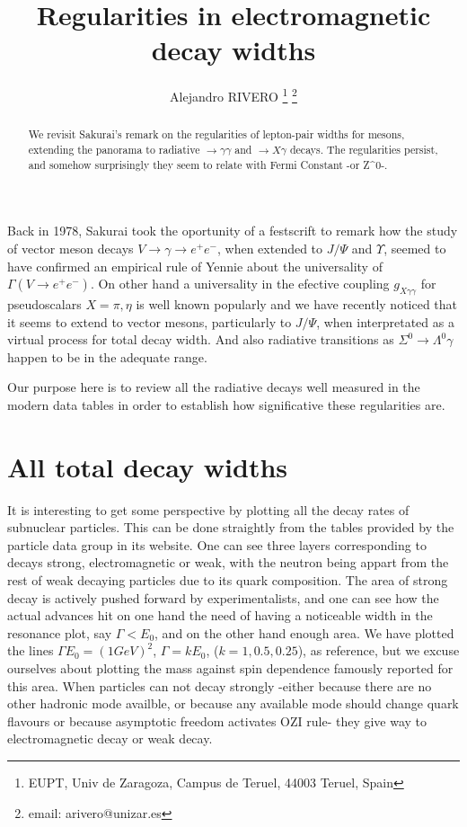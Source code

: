 \documentclass{article}
\begin{document}
\title{Regularities in electromagnetic decay widths}
\author{Alejandro RIVERO \thanks{EUPT, 
Univ de Zaragoza, Campus de Teruel, 
 44003 Teruel, Spain} \thanks{email: arivero@unizar.es}}

\maketitle

\begin{abstract}
We revisit Sakurai's remark on the regularities of lepton-pair widths for
mesons, extending the panorama to radiative $\to \gamma \gamma$ and 
$\to X \gamma$ decays. The regularities persist, and somehow surprisingly
they seem to relate with Fermi Constant -or Z^0-.
\end{abstract}

Back in 1978, Sakurai took the oportunity of a festscrift  \cite{Sakurai:1978xb} to 
remark how the study of 
vector meson decays $V \to \gamma \to e^+ e^-$, when extended to $J/\Psi$ and $\Upsilon$,
seemed to have confirmed an empirical rule of Yennie about the universality of  $\Gamma (V \to e^+ e^-)$. On other hand a universality in the efective coupling 
$g_{X\gamma\gamma}$ for pseudoscalars $X=\pi,\eta$ is well known popularly and we have recently
noticed that it seems to extend to vector mesons, particularly to $J/\Psi$, when interpretated
as a virtual process for total decay width. And also radiative transitions as $\Sigma^0 \to
\Lambda^0 \gamma$ happen to be in the adequate range. 

Our purpose here is to review all the radiative decays well measured in the modern data tables
in order to establish how significative these regularities are.

\section{All total decay widths}
It is interesting to get some perspective by plotting all the decay rates of subnuclear 
particles. This can be done straightly from the tables provided by the particle data group \cite{}
in its website. One can see three layers corresponding to decays strong, 
electromagnetic or weak, with the neutron being appart
from the rest of weak
decaying particles due to its quark composition.
The area of strong decay is actively pushed forward by experimentalists, 
and one can see how the actual advances hit on one hand the need of 
having a noticeable width in the resonance plot, 
say $\Gamma<E_0$, and on the other hand enough area. We have plotted 
the lines $\Gamma E_0 = 
(1 GeV)^2$, $\Gamma= k E_0$, ($k=1, 0.5, 0.25$), as reference, but we 
excuse ourselves about
plotting the mass against spin dependence famously reported
for this area. 
When particles can not decay strongly -either because there are no other
hadronic mode availble, or because any available mode
should change quark flavours or because asymptotic freedom activates
OZI rule- they give way to electromagnetic decay or weak decay.  
\end{document}
